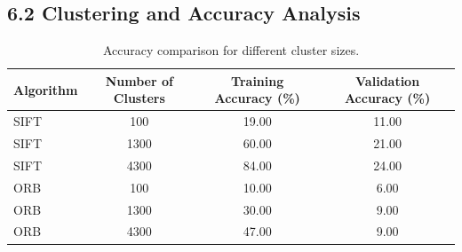 \documentclass[12pt]{article}
\begin{document}
\subsection*{6.2 Clustering and Accuracy Analysis}

\begin{table}[H]
\centering
\begin{tabular}{@{}lccc@{}}
\toprule
\textbf{Algorithm} & \textbf{Number of Clusters} & \textbf{Training Accuracy (\%)} & \textbf{Validation Accuracy (\%)} \\ \midrule
SIFT               & 100                         & 19.00                           & 11.00                             \\
SIFT               & 1300                        & 60.00                           & 21.00                             \\
SIFT               & 4300                        & 84.00                           & 24.00                             \\ \midrule
ORB                & 100                         & 10.00                           & 6.00                              \\
ORB                & 1300                        & 30.00                           & 9.00                              \\
ORB                & 4300                        & 47.00                           & 9.00                              \\ \bottomrule
\end{tabular}
\caption{Accuracy comparison for different cluster sizes.}
\label{tab:accuracy_comparison}
\end{table}
\end{document}
